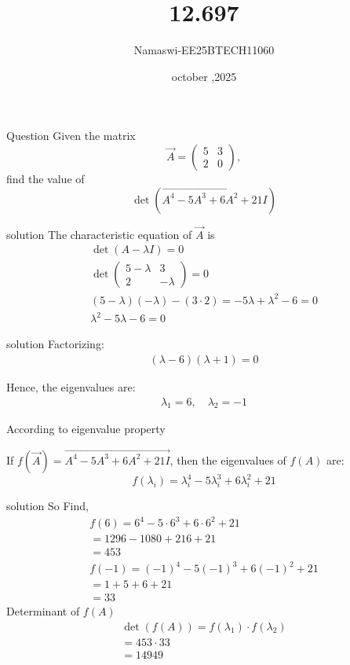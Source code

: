 \documentclass{beamer}
\begin{document}
\title 
{12.697}
\date{october ,2025}


\author 
{Namaswi-EE25BTECH11060}
\frame{\titlepage}
\begin{frame}{Question}
Given the matrix 
\[
\Vec{A} = \begin{pmatrix} 5 & 3 \\ 2 & 0 \end{pmatrix},
\] 
find the value of 
\[
\det(\Vec{A^4 - 5A^3 + 6A^2 + 21I})
\] 
\end{frame}
\begin{frame}{solution}
    The characteristic equation of $\Vec{A}$ is
\begin{align}
\det(A - \lambda I) = 0\\
\det \begin{pmatrix} 5-\lambda & 3 \\ 2 & -\lambda \end{pmatrix} = 0\\
(5-\lambda)(-\lambda) - (3 \cdot 2) = -5\lambda + \lambda^2 - 6 = 0\\
\lambda^2 - 5\lambda - 6 = 0
\end{align}
\end{frame}
\begin{frame}{solution}
    Factorizing:
\begin{align}
(\lambda - 6)(\lambda + 1) = 0
\end{align}

Hence, the eigenvalues are:
\begin{align}
\lambda_1 = 6, \quad \lambda_2 = -1
\end{align}

According to eigenvalue property

If $f(\Vec{A}) = \Vec{A^4 - 5A^3 + 6A^2 + 21I} $, then the eigenvalues of $f(A)$ are:
\[
f(\lambda_i) = \lambda_i^4 - 5\lambda_i^3 + 6\lambda_i^2 + 21
\]
\end{frame}
\begin{frame}{solution}
    So Find,
\begin{align}
f(6) = 6^4 - 5 \cdot 6^3 + 6 \cdot 6^2 + 21  \\= 1296 - 1080 + 216 + 21  \\ = 453 \\
f(-1) = (-1)^4 - 5(-1)^3 + 6(-1)^2 + 21 \\  = 1 + 5 + 6 + 21 \\  = 33
\end{align}
 Determinant of $f(A)$  
\begin{align}
\det(f(A)) = f(\lambda_1) \cdot f(\lambda_2)\\ = 453 \cdot 33 \\
= 14949
\end{align}
\end{frame}
\end{document}
